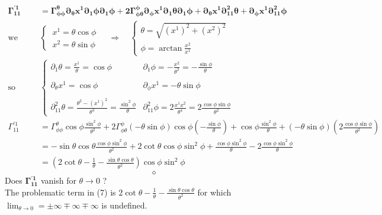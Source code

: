 \begin{align}
\boldsymbol{\Gamma_{11}^{'1}} &=\boldsymbol{\Gamma_{\phi\phi}^{\theta}\partial_{\theta}{x^{1}}\partial_{1}\phi\partial_{1}\phi+ 2\Gamma_{\phi\theta}^{\phi}\partial_{\phi}{x^{1}}\partial_{1}\theta\partial_{1}\phi+\partial_{\theta}{x^{1}}\partial^2_{11}{\theta}+\partial_{\phi}{x^{1}}\partial^2_{11}{\phi}}\\
\text{we have}\quad & \left \{ \begin{array}{l}
\ x^1 = \theta\cos\phi\\
\ x^2 = \theta\sin\phi\
\end{array}\right. \quad \Rightarrow \quad \left \{ \begin{array}{l}
\theta = \sqrt{(x^1)^2+(x^2)^2}\\
\phi = \arctan \frac{x^2}{x^1}
\end{array}\right.\\
\text{so}\ &\left \{ \begin{array}{ll}
\partial_{1} \theta = \frac{x^1}{\theta} = \cos\phi & \partial_{1} \phi = -\frac{x^2}{\theta^2} = -\frac{\sin\phi}{\theta}  \\\\
\partial_{\theta} x^1 = \cos\phi & \partial_{\phi} x^1 = -\theta\sin\phi\\\\
\partial^2_{11} \theta = \frac{\theta^2 -(x^1)^2}{\theta ^3} = \frac{\sin^2\phi}{\theta} & \partial^2_{11} \phi =2\frac{x^1 x^2}{\theta^4}= 2\frac{\cos\phi \sin\phi}{\theta^2}
\end{array}\right.\\
\Gamma_{11}^{'1} &=\Gamma_{\phi\phi}^{\theta}\cos\phi\frac{\sin^2\phi}{\theta^2}+ 2\Gamma_{\phi\theta}^{\phi}(-\theta\sin\phi)\cos\phi(-\frac{\sin\phi}{\theta} )+\cos\phi\frac{\sin^2\phi}{\theta}+(-\theta\sin\phi)(2\frac{\cos\phi \sin\phi}{\theta^2})\\
\ &= -\sin\theta\cos\theta\frac{\cos\phi \sin^2\phi}{\theta^2}+ 2\cot\theta\cos\phi\sin^2\phi+\frac{\cos\phi\sin^2\phi}{\theta}-2\frac{\cos\phi \sin^2\phi}{\theta}\\
\ &= (2\cot\theta -\frac{1}{\theta}-\frac{\sin\theta\cos\theta}{\theta^2})\cos\phi\sin^2\phi
\end{align}
$$\diamond$$
\newpage
Does $\boldsymbol{\Gamma_{11}^{'1}}$ vanish for $\theta \rightarrow0$ ? \\The problematic term in (7) is $2\cot\theta -\frac{1}{\theta}-\frac{\sin\theta\cos\theta}{\theta^2}$ for which $\lim_{\theta \to 0 }= \pm \infty \mp \infty \mp \infty$ is undefined. 
